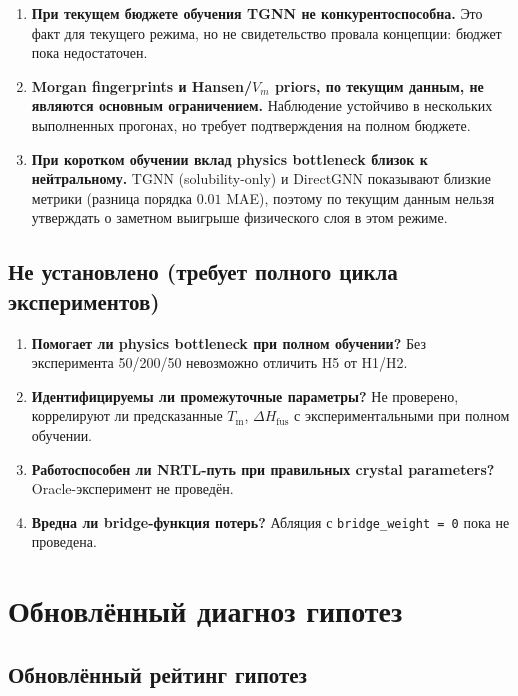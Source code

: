 \documentclass[11pt]{article}
\begin{document}
\begin{enumerate}
  \item \textbf{При текущем бюджете обучения TGNN не конкурентоспособна.} Это факт для текущего режима, но не свидетельство провала концепции: бюджет пока недостаточен.
  \item \textbf{Morgan fingerprints и Hansen/$V_m$ priors, по текущим данным, не являются основным ограничением.} Наблюдение устойчиво в нескольких выполненных прогонах, но требует подтверждения на полном бюджете.
  \item \textbf{При коротком обучении вклад physics bottleneck близок к нейтральному.} TGNN (solubility-only) и DirectGNN показывают близкие метрики (разница порядка $0.01$ MAE), поэтому по текущим данным нельзя утверждать о заметном выигрыше физического слоя в этом режиме.
\end{enumerate}

\subsection{Не установлено (требует полного цикла экспериментов)}

\begin{enumerate}
  \item \textbf{Помогает ли physics bottleneck при полном обучении?} Без эксперимента 50/200/50 невозможно отличить H5 от H1/H2.
  \item \textbf{Идентифицируемы ли промежуточные параметры?} Не проверено, коррелируют ли предсказанные $T_{\mathrm{m}}$, $\Delta H_{\mathrm{fus}}$ с экспериментальными при полном обучении.
  \item \textbf{Работоспособен ли NRTL-путь при правильных crystal parameters?} Oracle-эксперимент не проведён.
  \item \textbf{Вредна ли bridge-функция потерь?} Абляция с \texttt{bridge\_weight = 0} пока не проведена.
\end{enumerate}

\section{Обновлённый диагноз гипотез}
\label{sec:updated-hypotheses}

\subsection{Обновлённый рейтинг гипотез}
\end{document}
